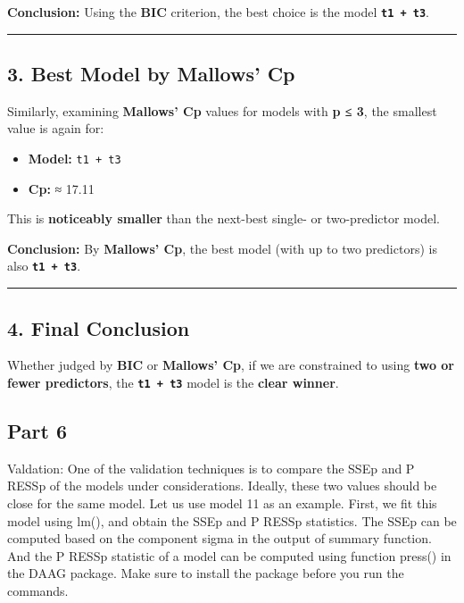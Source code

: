 \documentclass[
]{article}
\providecommand{\tightlist}{%
  \setlength{\itemsep}{0pt}\setlength{\parskip}{0pt}}
\begin{document}
\textbf{Conclusion:} Using the \textbf{BIC} criterion, the best choice
is the model \textbf{\texttt{t1\ +\ t3}}.

\begin{center}\rule{0.5\linewidth}{0.5pt}\end{center}

\subsection{3. Best Model by Mallows'
Cp}\label{best-model-by-mallows-cp}

Similarly, examining \textbf{Mallows' Cp} values for models with
\textbf{p ≤ 3}, the smallest value is again for:

\begin{itemize}
\tightlist
\item
  \textbf{Model:} \texttt{t1\ +\ t3}
\item
  \textbf{Cp:} ≈ 17.11
\end{itemize}

This is \textbf{noticeably smaller} than the next-best single- or
two-predictor model.

\textbf{Conclusion:} By \textbf{Mallows' Cp}, the best model (with up to
two predictors) is also \textbf{\texttt{t1\ +\ t3}}.

\begin{center}\rule{0.5\linewidth}{0.5pt}\end{center}

\subsection{4. Final Conclusion}\label{final-conclusion}

Whether judged by \textbf{BIC} or \textbf{Mallows' Cp}, if we are
constrained to using \textbf{two or fewer predictors}, the
\textbf{\texttt{t1\ +\ t3}} model is the \textbf{clear winner}.

\subsection{Part 6}\label{part-6}

Valdation: One of the validation techniques is to compare the SSEp and P
RESSp of the models under considerations. Ideally, these two values
should be close for the same model. Let us use model 11 as an example.
First, we fit this model using lm(), and obtain the SSEp and P RESSp
statistics. The SSEp can be computed based on the component sigma in the
output of summary function. And the P RESSp statistic of a model can be
computed using function press() in the DAAG package. Make sure to
install the package before you run the commands.
\end{document}
